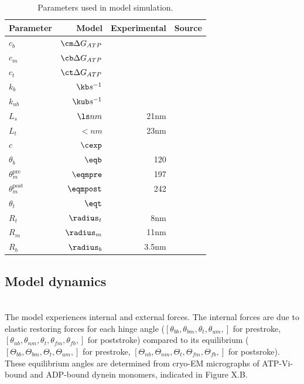 \documentclass[9pt,twocolumn,twoside]{pnas-new}
\begin{document}
\begin{table}[tbhp]
\centering
\caption{Parameters used in model simulation.}
\label{tab:staticparams}
\begin{tabular}{lrrr}
Parameter & Model & Experimental & Source \\
\midrule
$c_b$ & $\cm \Delta G_{ATP}$ &  & \\
$c_m$ & $\cb \Delta G_{ATP}$ &  & \\
$c_t$ & $\ct \Delta G_{ATP}$ &  & \\
$k_b$ & $\kb s^{-1}$&  & \\
$k_{ub}$ & $\kub s^{-1}$ & & \\
$L_s$ & $\ls nm$ & 21nm & \cite{burgess-paper, 3vkh-cite, carter-paper}\\
$L_t$ & $\lt nm$ & 23nm & \cite{burgess-paper, 3vkh-cite, carter-paper}\\
$c$ & $\cexp$ & & \\
$\theta_b$ & $\eqb$ &  120 & \cite{leschziner} \\
$\theta_m^{\mbox{pre}}$ & $\eqmpre$ &  197 & \cite{burgess-paper}\\
$\theta_m^{\mbox{post}}$ & $\eqmpost$ & 242 & \cite{burgess-paper}\\
$\theta_t$ & $\eqt$ &  & \\
$R_t$ & $\radius_t$ & 8nm & \cite{burgess-paper}\\
$R_m$ & $\radius_m$ & 11nm & \cite{burgess-paper}\\
$R_b$ & $\radius_b$ & 3.5nm & \cite{burgess-paper}\\

\bottomrule
\end{tabular}

\end{table}

\subsection*{Model dynamics}~\\
The model experiences internal and external forces. The internal forces are due to elastic restoring forces for each hinge angle ($\left[\theta_{bb}, \theta_{bm}, \theta_{t}, \theta_{um},\right]$ for prestroke, $\left[\theta_{nb}, \theta_{nm}, \theta_{t}, \theta_{fm}, \theta_{fb},\right]$ for poststroke) compared to its equilibrium ($\left[\Theta_{bb}, \Theta_{bm}, \Theta_{t}, \Theta_{um},\right]$ for prestroke, $\left[\Theta_{nb}, \Theta_{nm}, \Theta_{t}, \Theta_{fm}, \Theta_{fb},\right]$ for postsroke). These equilibrium angles are determined from cryo-EM micrographs of ATP-Vi-bound and ADP-bound dynein monomers, indicated in Figure X.B.\\
\end{document}
